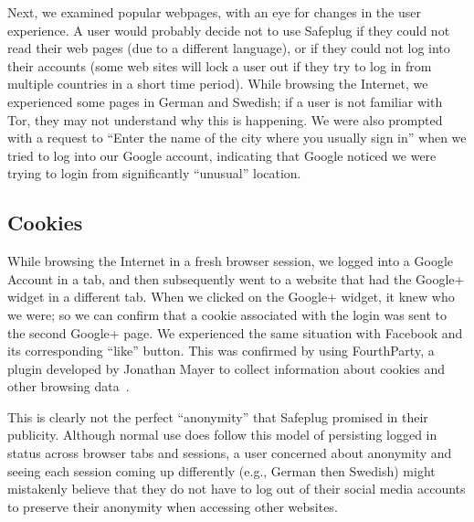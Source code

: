\documentclass[letterpaper,twocolumn,10pt]{article}
\begin{document}

Next, we examined popular webpages, with an eye for changes in the user experience.  A user would probably decide not to use Safeplug if they could not read their web pages (due to a different language), or if they could not log into their accounts (some web sites will lock a user out if they try to log in from multiple countries in a short time period).  While browsing the Internet, we experienced some pages in German and Swedish; if a user is not familiar with Tor, they may not understand why this is happening.  We were also prompted with a request to ``Enter the name of the city where you usually sign in'' when we tried to log into our Google account, indicating that Google noticed we were trying to login from significantly ``unusual'' location.

\subsection{Cookies}  
While browsing the Internet in a fresh browser session, we logged into a Google Account in a tab, and then subsequently went to a website that had the Google+ widget in a different tab.  When we clicked on the Google+ widget, it knew who we were; so we can confirm that a cookie associated with the login was sent to the second Google+ page.  We experienced the same situation with Facebook and its corresponding ``like'' button.  This was confirmed by using FourthParty, a plugin developed by Jonathan Mayer to collect information about cookies and other browsing data~\cite{fourthparty}.

This is clearly not the perfect ``anonymity'' that Safeplug promised in their publicity.  Although normal use does follow this model of persisting logged in status across browser tabs and sessions, a user concerned about anonymity and seeing each session coming up differently (e.g., German then Swedish) might mistakenly believe that they do not have to log out of their social media accounts to preserve their anonymity when accessing other websites.
\end{document}
